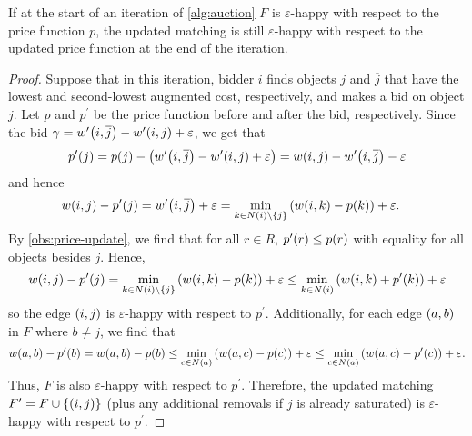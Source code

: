 \begin{lemma}
    If at the start of an iteration of \cref{alg:auction} $F$ is $\varepsilon$-happy with respect to the price function $p$, the updated 
    matching is still $\varepsilon$-happy with respect to the updated price function at the end of the iteration. 
    \label{lem:F-eps-happy}
\end{lemma}
\begin{proof}
    Suppose that in this iteration, bidder $i$ finds objects $j$ and $\overline{j}$ that have the lowest and second-lowest augmented cost, respectively, 
    and makes a bid on object $j$. 
    Let $p$ and $p^\prime$ be the price function before and after the bid, respectively. Since the bid 
    $\gamma = \f[w^\prime]{i, \overline{j}} - \f[w^\prime]{i, j} + \varepsilon$, we get that 
    \begin{align*}
        \f[p^\prime]{j} = \f[p]{j} - \lrp{\f[w^\prime]{i, \overline{j}} - \f[w^\prime]{i, j} + \varepsilon}
        = \f[w]{i, j} - \f[w^\prime]{i, \overline{j}} - \varepsilon
    \end{align*}
    and hence 
    \begin{align*}
        \f[w]{i, j} - \f[p^\prime]{j} &= \f[w^\prime]{i, \overline{j}} + \varepsilon
        = \min_{k \in N(i) \sm \lrc{j}} \lrp{\f[w]{i, k} - \f[p]{k}} + \varepsilon.
    \end{align*}
    By \cref{obs:price-update}, we find that for all $r \in R$, $\f[p^\prime]{r} \leq \f[p]{r}$ with equality for all objects besides $j$. 
    Hence, 
    \begin{align*}
        \f[w]{i, j} - \f[p^\prime]{j} = \min_{k \in N(i) \sm \lrc{j}} \lrp{\f[w]{i, k} - \f[p]{k}} + \varepsilon \leq \min_{k \in N(i)} \lrp{\f[w]{i, k} + \f[p^\prime]{k}} + \varepsilon
    \end{align*}
    so the edge $\lrp{i, j}$ is $\varepsilon$-happy with respect to $p^\prime$.  
    Additionally, for each edge $\lrp{a, b}$ in $F$ where $b \neq j$, we find that 
    \begin{equation*}
        \f[w]{a, b} - \f[p^\prime]{b} = \f[w]{a, b} - \f[p]{b} \leq \min_{c \in N(a)} \lrp{\f[w]{a, c} - \f[p]{c}} + \varepsilon \leq \min_{c \in N(a)} \lrp{\f[w]{a, c} - \f[p^\prime]{c}} + \varepsilon.
    \end{equation*}
    Thus, $F$ is also $\varepsilon$-happy with respect to $p^\prime$.
    Therefore, the updated matching $F^\prime = F \cup \lrc{\lrp{i, j}}$ (plus any additional removals if $j$ is already saturated) is $\varepsilon$-happy with respect to $p^\prime$. 
\end{proof}
